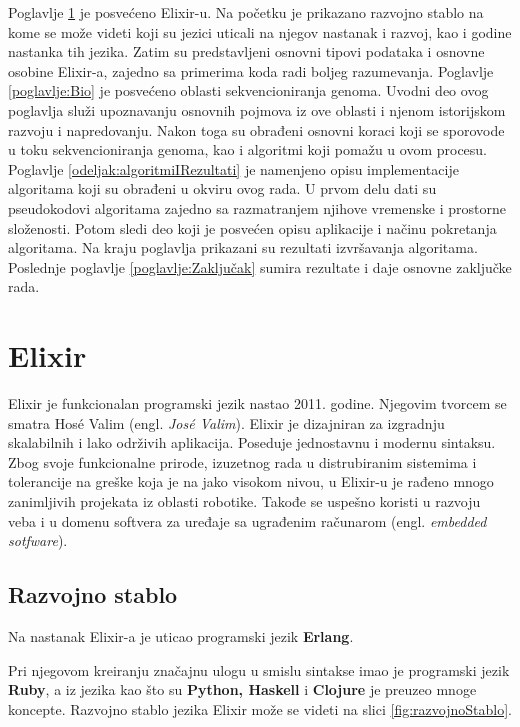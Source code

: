 \documentclass[12pt,oneside]{memoir}
\begin{document}
Poglavlje \ref{poglavlje:prvoPoglavlje} je posvećeno Elixir-u. Na početku je prikazano razvojno stablo na kome se može videti koji su jezici uticali na njegov nastanak i razvoj, kao i godine nastanka tih jezika. Zatim su predstavljeni osnovni tipovi podataka i osnovne osobine Elixir-a, zajedno sa primerima koda radi boljeg razumevanja. Poglavlje \ref{poglavlje:Bio} je posvećeno oblasti sekvencioniranja genoma. Uvodni deo ovog poglavlja služi upoznavanju osnovnih pojmova iz ove oblasti i njenom istorijskom razvoju i napredovanju. Nakon toga su obrađeni osnovni koraci koji se sporovode u toku sekvencioniranja genoma, kao i algoritmi koji pomažu u ovom procesu. Poglavlje \ref{odeljak:algoritmiIRezultati} je namenjeno opisu implementacije algoritama koji su obrađeni u okviru ovog rada. U prvom delu dati su pseudokodovi algoritama zajedno sa razmatranjem njihove vremenske i prostorne složenosti. Potom sledi deo koji je posvećen opisu aplikacije i načinu pokretanja algoritama. Na kraju poglavlja prikazani su rezultati izvršavanja algoritama. Poslednje poglavlje \ref{poglavlje:Zaključak} sumira rezultate i daje osnovne zaključke rada.

\chapter{Elixir} %
\label{poglavlje:prvoPoglavlje}

Elixir je funkcionalan programski jezik nastao 2011. godine. Njegovim tvorcem se smatra Hosé Valim (engl. \textit{José Valim}). Elixir je dizajniran za izgradnju skalabilnih i lako održivih aplikacija. Poseduje jednostavnu i modernu sintaksu. Zbog svoje funkcionalne prirode, izuzetnog rada u distrubiranim sistemima i tolerancije na greške koja je na jako visokom nivou, u Elixir-u je rađeno mnogo zanimljivih projekata iz oblasti robotike. Takođe se uspešno koristi u razvoju veba i u domenu softvera za uređaje sa ugrađenim računarom (engl. \textit{embedded sotfware}).



\section{Razvojno stablo}

Na nastanak Elixir-a je uticao programski jezik \textbf{Erlang}. 
\begin{comment}Elixir radi uz podršku virtualne mašine ovog jezika koja je karakteristična po minimalnom kašnjenju i zavidnoj toleranciji na greške. 
\end{comment}
Pri njegovom kreiranju značajnu ulogu u smislu sintakse imao je programski jezik \textbf{Ruby}, a iz jezika kao što su \textbf{Python, Haskell} i \textbf{Clojure} je preuzeo mnoge koncepte. Razvojno stablo jezika Elixir može se videti na slici \ref{fig:razvojnoStablo}. 
\begin{comment}
U Elixir-u ne postoje objekti i klase, već se sve zasniva na funkcijama i rekurziji. (izmeni) 
\end{comment}
\end{document}
